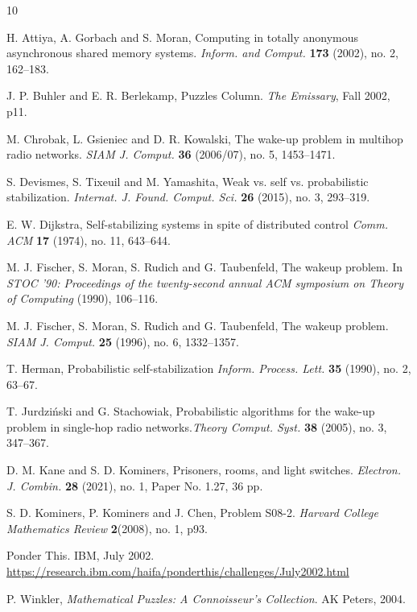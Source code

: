 \documentclass[a4paper,11pt]{extarticle}
\theoremstyle{definition}
\theoremstyle{remark}
\begin{document}
	\begin{thebibliography}{10}
		
		H. Attiya, A. Gorbach and S. Moran,
		\newblock Computing in totally anonymous asynchronous shared memory systems.
		\newblock\textit{Inform. and Comput.} \textbf{173} (2002), no. 2, 162--183.
		
		J. P. Buhler and E. R. Berlekamp,
		\newblock Puzzles Column.
		\newblock\textit{The Emissary}, Fall 2002, p11.
		
		M. Chrobak, L. Gsieniec and D. R. Kowalski,
		\newblock The wake-up problem in multihop radio networks.
		\newblock\textit{SIAM J. Comput.} \textbf{36} (2006/07), no. 5, 1453--1471.
		
		S. Devismes, S. Tixeuil and M. Yamashita,
		\newblock Weak vs. self vs. probabilistic stabilization.
		\newblock\textit{Internat. J. Found. Comput. Sci.} \textbf{26} (2015), no. 3, 293--319.
		
		E. W. Dijkstra,
		\newblock Self-stabilizing systems in spite of distributed control
		\newblock\textit{Comm. ACM} \textbf{17} (1974), no. 11,
		643--644.
		
		M. J. Fischer, S. Moran, S. Rudich and G. Taubenfeld,
		\newblock The wakeup problem.
		\newblock In \textit{STOC '90: Proceedings of the twenty-second annual ACM symposium on Theory of Computing} (1990), 106--116.
		
		M. J. Fischer, S. Moran, S. Rudich and G. Taubenfeld,
		\newblock The wakeup problem.
		\newblock \textit{SIAM J. Comput.} \textbf{25} (1996), no. 6, 1332--1357.
		
		T. Herman,
		\newblock Probabilistic self-stabilization
		\newblock\textit{Inform. Process. Lett.} \textbf{35} (1990), no. 2, 63--67.
		
		T. Jurdzi\' nski and G. Stachowiak,
		\newblock Probabilistic algorithms for the wake-up problem in single-hop radio networks.\newblock\textit{Theory Comput. Syst.} \textbf{38} (2005), no. 3, 347--367.
		
		D. M. Kane and S. D. Kominers, 
		\newblock Prisoners, rooms, and light switches. 
		\newblock\textit{Electron. J. Combin.} \textbf{28} (2021), no. 1, Paper No. 1.27, 36 pp.
		
		S. D. Kominers, P. Kominers and J. Chen,
		\newblock Problem S08-2.
		\newblock\textit{Harvard College Mathematics Review} \textbf{2}(2008), no. 1, p93.
		
		Ponder This. 
		\newblock IBM, July 2002.
		\newblock\url{https://research.ibm.com/haifa/ponderthis/challenges/July2002.html}
		
		P. Winkler,
		\newblock \textit{Mathematical Puzzles:  A Connoisseur’s Collection}. 
		\newblock AK Peters, 2004.
		
	\end{thebibliography}
	
\end{document}
